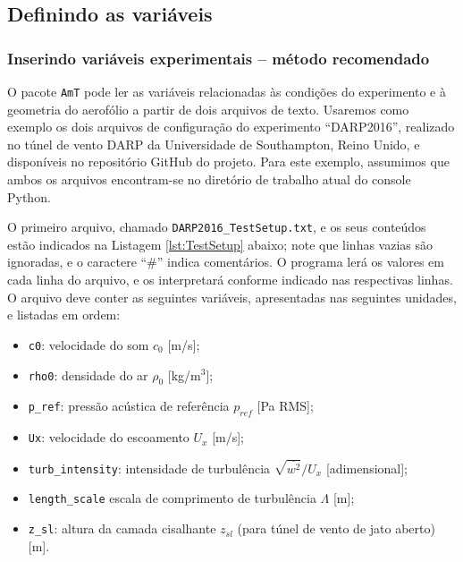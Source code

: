 \documentclass[a4paper, 11pt, twoside]{article}
\newcommand{\AmT}{\texttt{AmT}}
\begin{document}

\subsection{Definindo as variáveis}

\subsubsection{Inserindo variáveis experimentais -- método recomendado}

O pacote \AmT{} pode ler as variáveis relacionadas às condições do experimento e à geometria do aerofólio a partir de dois arquivos de texto. Usaremos como exemplo os dois arquivos de configuração do experimento ``DARP2016'', realizado no túnel de vento DARP da Universidade de Southampton, Reino Unido, e disponíveis no repositório GitHub do projeto. Para este exemplo, assumimos que ambos os arquivos encontram-se no diretório de trabalho atual do console Python.

O primeiro arquivo, chamado \verb|DARP2016_TestSetup.txt|, e os seus conteúdos estão indicados na Listagem \ref{lst:TestSetup} abaixo; note que linhas vazias são ignoradas, e o caractere ``\#'' indica comentários. O programa lerá os valores em cada linha do arquivo, e os interpretará conforme indicado nas respectivas linhas. O arquivo deve conter as seguintes variáveis, apresentadas nas seguintes unidades, e listadas em ordem:

\begin{itemize}
	\item \verb|c0|: velocidade do som $c_0$ [m/s];
	\item \verb|rho0|: densidade do ar $\rho_0$ [kg/m$^3$];
	\item \verb|p_ref|: pressão acústica de referência $p_{ref}$ [Pa RMS];
	\item \verb|Ux|: velocidade do escoamento $U_x$ [m/s];
	\item \verb|turb_intensity|: intensidade de turbulência $\sqrt{\overline{w^2}}/U_x$ [adimensional];
	\item \verb|length_scale| escala de comprimento de turbulência $\Lambda$ [m];
	\item \verb|z_sl|: altura da camada cisalhante $z_{sl}$ (para túnel de vento de jato aberto) [m].
\end{itemize}
\end{document}
